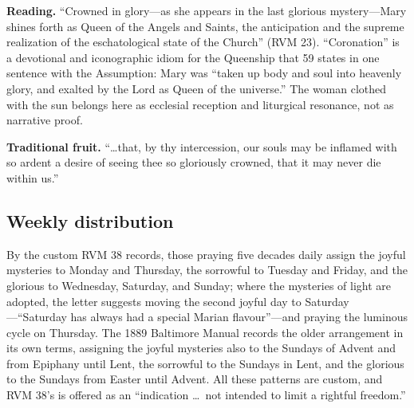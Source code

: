 \textbf{Reading.} ``Crowned in glory---as she appears in the last
glorious mystery---Mary shines forth as Queen of the Angels and Saints,
the anticipation and the supreme realization of the eschatological state
of the Church'' (RVM 23). ``Coronation'' is a devotional and
iconographic idiom for the Queenship that  59 states
in one sentence with the Assumption: Mary was ``taken up body and soul
into heavenly glory, and exalted by the Lord as Queen of the
universe.'' The woman clothed with the sun belongs here as ecclesial
reception and liturgical resonance, not as narrative
proof.

\textbf{Traditional fruit.} ``\ldots that, by thy intercession, our
souls may be inflamed with so ardent a desire of seeing thee so
gloriously crowned, that it may never die within us.''

\subsection{Weekly distribution}

By the custom RVM 38 records, those praying five decades daily assign
the joyful mysteries to Monday and Thursday, the sorrowful to Tuesday
and Friday, and the glorious to Wednesday, Saturday, and Sunday; where
the mysteries of light are adopted, the letter suggests moving the
second joyful day to Saturday---``Saturday has always had a special
Marian flavour''---and praying the luminous cycle on Thursday. The 1889
Baltimore Manual records the older arrangement in its own terms,
assigning the joyful mysteries also to the Sundays of Advent and from
Epiphany until Lent, the sorrowful to the Sundays in Lent, and the
glorious to the Sundays from Easter until Advent. All these patterns are
custom, and RVM 38's is offered as an ``indication \ldots\ not intended
to limit a rightful freedom.''
